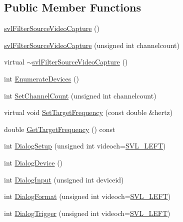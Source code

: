 \subsection*{Public Member Functions}
\begin{DoxyCompactItemize}
\item 
\hyperlink{classsvl_filter_source_video_capture_a7f25fb86c326d7abb1b1d83a336283ab}{svl\+Filter\+Source\+Video\+Capture} ()
\item 
\hyperlink{classsvl_filter_source_video_capture_a3f7ef92098e7365ea75adfd3b5ba6084}{svl\+Filter\+Source\+Video\+Capture} (unsigned int channelcount)
\item 
virtual \hyperlink{classsvl_filter_source_video_capture_aa562e71761456f45d66fdad6855508a2}{$\sim$svl\+Filter\+Source\+Video\+Capture} ()
\item 
int \hyperlink{classsvl_filter_source_video_capture_aa23d8b697cd920034d4b2eca29defcea}{Enumerate\+Devices} ()
\item 
int \hyperlink{classsvl_filter_source_video_capture_af5e7798d59ea80decda47baaa233f637}{Set\+Channel\+Count} (unsigned int channelcount)
\item 
virtual void \hyperlink{classsvl_filter_source_video_capture_adfd8794f6f06b431beb7022370b7b6ef}{Set\+Target\+Frequency} (const double \&hertz)
\item 
double \hyperlink{classsvl_filter_source_video_capture_a79b4017c863b616bb138b54d4875d280}{Get\+Target\+Frequency} () const 
\item 
int \hyperlink{classsvl_filter_source_video_capture_a312929cfc056417d0884be3575e12072}{Dialog\+Setup} (unsigned int videoch=\hyperlink{svl_definitions_8h_ab9fec7615f19c8df2919eebcab0b187f}{S\+V\+L\+\_\+\+L\+E\+F\+T})
\item 
int \hyperlink{classsvl_filter_source_video_capture_ac406e5e23bd3a8aa68f6b17e6d8afa99}{Dialog\+Device} ()
\item 
int \hyperlink{classsvl_filter_source_video_capture_a6dbe33ac0c7aebb296ebcf16c3b8c860}{Dialog\+Input} (unsigned int deviceid)
\item 
int \hyperlink{classsvl_filter_source_video_capture_a70944875b11f999ccbe6f50874e694d0}{Dialog\+Format} (unsigned int videoch=\hyperlink{svl_definitions_8h_ab9fec7615f19c8df2919eebcab0b187f}{S\+V\+L\+\_\+\+L\+E\+F\+T})
\item 
int \hyperlink{classsvl_filter_source_video_capture_aa0be0c5befb0a6fc76277a1df61c5513}{Dialog\+Trigger} (unsigned int videoch=\hyperlink{svl_definitions_8h_ab9fec7615f19c8df2919eebcab0b187f}{S\+V\+L\+\_\+\+L\+E\+F\+T})

\end{DoxyCompactItemize}
